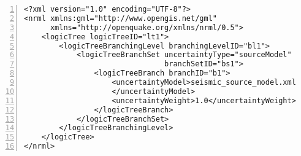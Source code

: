 \begin{Verbatim}[frame=single, commandchars=\\\{\}, fontsize=\small,
    firstnumber=1, numbers=left, numbersep=2pt]
<?xml version="1.0" encoding="UTF-8"?>
<nrml xmlns:gml="http://www.opengis.net/gml"
      xmlns="http://openquake.org/xmlns/nrml/0.5">
    <logicTree logicTreeID="lt1">
        <logicTreeBranchingLevel branchingLevelID="bl1">
            <logicTreeBranchSet uncertaintyType="sourceModel"
                                branchSetID="bs1">
                <logicTreeBranch branchID="b1">
                    <uncertaintyModel>seismic_source_model.xml
                    </uncertaintyModel>
                    <uncertaintyWeight>1.0</uncertaintyWeight>
                </logicTreeBranch>
            </logicTreeBranchSet>
        </logicTreeBranchingLevel>
    </logicTree>
</nrml>
\end{Verbatim}